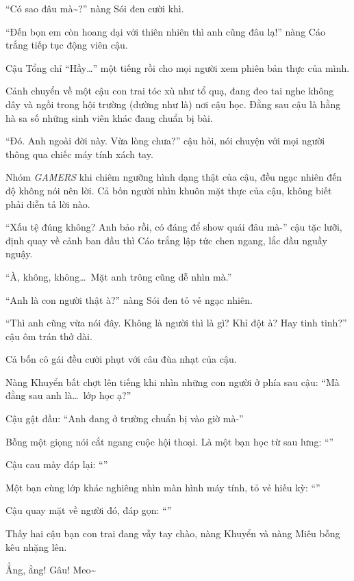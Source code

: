 \documentclass[../main.tex]{subfiles}
\begin{document}
``Có sao đâu mà\~{}?'' nàng Sói đen cười khì.

``Đến bọn em còn hoang dại với thiên nhiên thì anh cũng đâu lạ!'' nàng Cáo trắng tiếp tục động viên cậu.

Cậu Tổng chỉ ``Hầy\dots'' một tiếng rồi cho mọi người xem phiên bản thực của mình.

Cảnh chuyển về một cậu con trai tóc xù như tổ quạ, đang đeo tai nghe không dây và ngồi trong hội trường (dường như là) nơi cậu học. Đằng sau cậu là hằng hà sa số những sinh viên khác đang chuẩn bị bài.


``Đó. Anh ngoài đời này. Vừa lòng chưa?'' cậu hỏi, nói chuyện với mọi người thông qua chiếc máy tính xách tay.

Nhóm \textit{GAMERS} khi chiêm ngưỡng hình dạng thật của cậu, đều ngạc nhiên đến độ không nói nên lời. Cả bốn người nhìn khuôn mặt thực của cậu, không biết phải diễn tả lời nào.

``Xấu tệ đúng không? Anh bảo rồi, có đáng để show quái đâu mà-'' cậu tặc lưỡi, định quay về cảnh ban đầu thì Cáo trắng lập tức chen ngang, lắc đầu nguầy nguậy.

``À, không, không\dots\ Mặt anh trông cũng dễ nhìn mà.''

``Anh là con người thật à?'' nàng Sói đen tỏ vẻ ngạc nhiên.

``Thì anh cũng vừa nói đây. Không là người thì là gì? Khỉ đột à? Hay tinh tinh?'' cậu ôm trán thở dài.

Cả bốn cô gái đều cười phụt với câu đùa nhạt của cậu.

Nàng Khuyển bất chợt lên tiếng khi nhìn những con người ở phía sau cậu: ``Mà đằng sau anh là\dots\ lớp học ạ?''

Cậu gật đầu: ``Anh đang ở trường chuẩn bị vào giờ mà-''

Bỗng một giọng nói cắt ngang cuộc hội thoại. Là một bạn học từ sau lưng: ``''

Cậu cau mày đáp lại: ``''

Một bạn cùng lớp khác nghiêng nhìn màn hình máy tính, tỏ vẻ hiếu kỳ: ``''

Cậu quay mặt về người đó, đáp gọn: ``''

Thấy hai cậu bạn con trai  đang vẫy tay chào, nàng Khuyển và nàng Miêu bỗng kêu nhặng lên.

\begin{dialogue}
     Ẳng, ẳng! Gâu!
      Meo\~{}
\end{dialogue}
\end{document}
